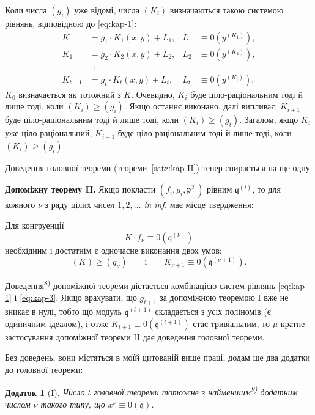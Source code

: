 \documentclass[11pt]{article}
\theoremstyle{plain}
\newtheorem{zusatz}{Додаток}
\begin{document}
Коли числа $(g_{i})$ уже відомі, числа $(K_{i})$ визначаються такою
системою рівнянь, відповідною до \eqref{eq:kap-1}:
\begin{equation}\label{eq:kap-3}
\begin{aligned}
K &= g_{1} \cdot K_{1}(x,y) + L_{1}, & L_{1} &\equiv 0(y^{(K_{1})}),\\
K_{1} &= g_{2} \cdot K_{2}(x,y) + L_{2}, & L_{2} &\equiv 0(y^{(K_{2})}),\\
&\;\;\vdots &&\\
K_{t-1} &= g_{t} \cdot K_{t}(x,y) + L_{t}, & L_{t} &\equiv 0(y^{(K_{t})}).
\end{aligned}
\end{equation}
$K_{0}$ визначається як тотожний з $K$. Очевидно, $K_{i}$ буде
ціло-раціональним тоді й лише тоді, коли $(K_{i}) \geq (g_{i})$.
Якщо останнє виконано, далі випливає: $K_{i+1}$ буде
ціло-раціональним тоді й лише тоді, коли $(K_{i}) \geq (g_{i})$.
Загалом, якщо $K_{i}$ уже ціло-раціональний, $K_{i+1}$ буде
ціло-раціональним тоді й лише тоді, коли $(K_{i}) \geq (g_{i})$.

Доведення головної теореми (теореми~\ref{satz:kap-II}) тепер
спирається на ще одну

\smallskip
\textbf{Допоміжну теорему II.} Якщо покласти
$(f_{i}, g_{i}, \mathfrak{p}^{2^{i}})$ рівним
$\mathfrak{q}^{(i)}$, то для кожного $\nu$ з ряду цілих чисел
$1, 2, \ldots$ \textit{in inf.} має місце твердження:

Для конгруенції
\[
K \cdot f_{\nu} \equiv 0(\mathfrak{q}^{(\nu)})
\]
необхідним і достатнім є одночасне виконання двох умов:
\[
(K) \geq (g_{\nu}) \qquad \text{і} \qquad K_{\nu+1} \equiv 0(\mathfrak{q}^{(\nu+1)}).
\]

Доведення\textsuperscript{8)} допоміжної теореми дістається
комбінацією систем рівнянь \eqref{eq:kap-1} і \eqref{eq:kap-3}. Якщо
врахувати, що $g_{t+1}$ за допоміжною теоремою I вже не зникає в
нулі, тобто що модуль $\mathfrak{q}^{(t+1)}$ складається з усіх
поліномів (є одиничним ідеалом), і отже
$K_{t+1} \equiv 0(\mathfrak{q}^{(t+1)})$ стає тривіальним, то
$\mu$-кратне застосування допоміжної теореми II дає доведення
головної теореми.

\smallskip
Без доведень, вони містяться в моїй цитованій вище праці, додам ще
два додатки до головної теореми:

\begin{zusatz}[I]
Число $t$ головної теореми тотожне з найменшим\textsuperscript{9)}
додатним числом $\nu$ такого типу, що $x^{\nu} \equiv 0(\mathfrak{q})$.
\end{zusatz}
\end{document}
